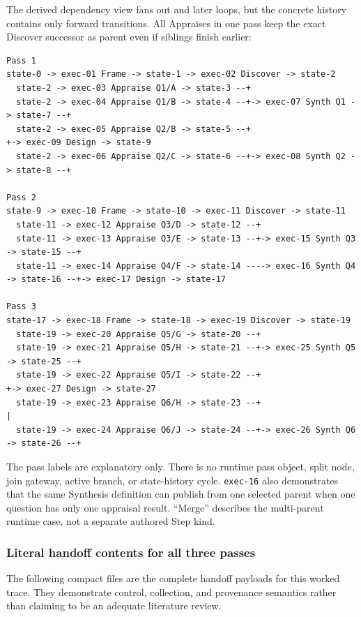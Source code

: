 \documentclass[11pt]{article}
\begin{document}
The derived dependency view fans out and later loops, but the concrete history
contains only forward transitions. All Appraises in one pass keep the exact
Discover successor as parent even if siblings finish earlier:

\begin{lstlisting}[style=playbook,basicstyle=\ttfamily\scriptsize]
Pass 1
state-0 -> exec-01 Frame -> state-1 -> exec-02 Discover -> state-2
  state-2 -> exec-03 Appraise Q1/A -> state-3 --+
  state-2 -> exec-04 Appraise Q1/B -> state-4 --+-> exec-07 Synth Q1 -> state-7 --+
  state-2 -> exec-05 Appraise Q2/B -> state-5 --+                                +-> exec-09 Design -> state-9
  state-2 -> exec-06 Appraise Q2/C -> state-6 --+-> exec-08 Synth Q2 -> state-8 --+

Pass 2
state-9 -> exec-10 Frame -> state-10 -> exec-11 Discover -> state-11
  state-11 -> exec-12 Appraise Q3/D -> state-12 --+
  state-11 -> exec-13 Appraise Q3/E -> state-13 --+-> exec-15 Synth Q3 -> state-15 --+
  state-11 -> exec-14 Appraise Q4/F -> state-14 ----> exec-16 Synth Q4 -> state-16 --+-> exec-17 Design -> state-17

Pass 3
state-17 -> exec-18 Frame -> state-18 -> exec-19 Discover -> state-19
  state-19 -> exec-20 Appraise Q5/G -> state-20 --+
  state-19 -> exec-21 Appraise Q5/H -> state-21 --+-> exec-25 Synth Q5 -> state-25 --+
  state-19 -> exec-22 Appraise Q5/I -> state-22 --+                                 +-> exec-27 Design -> state-27
  state-19 -> exec-23 Appraise Q6/H -> state-23 --+                                 |
  state-19 -> exec-24 Appraise Q6/J -> state-24 --+-> exec-26 Synth Q6 -> state-26 --+
\end{lstlisting}

The pass labels are explanatory only. There is no runtime pass object, split
node, join gateway, active branch, or state-history cycle. \texttt{exec-16}
also demonstrates that the same Synthesis definition can publish from one
selected parent when one question has only one appraisal result. ``Merge''
describes the multi-parent runtime case, not a separate authored Step kind.

\subsubsection{Literal handoff contents for all three passes}

The following compact files are the complete handoff payloads for this worked
trace. They demonstrate control, collection, and provenance semantics rather
than claiming to be an adequate literature review.
\end{document}
